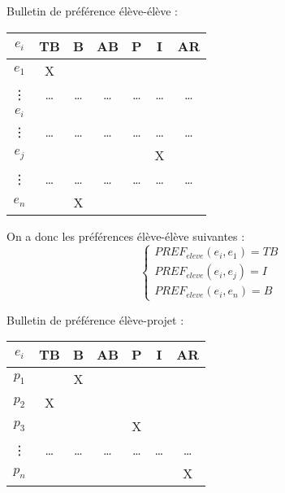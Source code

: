 \documentclass[10pt,a4paper]{scrartcl}
\begin{document}
\begin{table}[h!]
	\begin{minipage}{.4\linewidth}
		Bulletin de préférence élève-élève :\\
		\begin{tabular}[h]{|*{7}{c|}}
			\hline
			$e_{i}$  & TB  & B  & AB  & P  & I  & AR \\
			\hline
			$e_{1}$  & X &  &  &  &  & \\
			\hline
			\vdots  & \ldots  & \ldots & \ldots & \ldots & \ldots & \ldots \\
			\hline
			$e_{i}$ & \cellcolor{gray}  & \cellcolor{gray} & \cellcolor{gray} & \cellcolor{gray} & \cellcolor{gray} & \cellcolor{gray} \\
			\hline
			\vdots  & \ldots  & \ldots & \ldots & \ldots & \ldots & \ldots \\
			\hline
			$e_{j}$  &  &  &  &  & X & \\
			\hline
			\vdots  & \ldots  & \ldots & \ldots & \ldots & \ldots & \ldots \\
			\hline
			$e_{n}$  &  & X &  &  &  & \\
			\hline
		\end{tabular}
		
		\vspace{0.2cm}
		On a donc les préférences élève-élève suivantes : \\
		$$ 
		\left\{
			\begin{array}{ll}
				PREF_{eleve}(e_{i}, e_{1}) = TB \\
				PREF_{eleve}(e_{i}, e_{j}) = I \\
				PREF_{eleve}(e_{i}, e_{n}) = B
			\end{array}
		\right.
		$$
	\end{minipage}
	\hfill
	\begin{minipage}[h]{.4\linewidth}
		Bulletin de préférence élève-projet :\\
		\begin{tabular}{|*{7}{c|}}
			\hline
			$e_{i}$  & TB  & B  & AB  & P  & I  & AR \\
			\hline
			$p_{1}$  &  & X &  &  &  & \\
			\hline
			$p_{2}$  & X &  &  &  &  & \\
			\hline
			$p_{3}$  &  &  &  & X &  & \\
			\hline
			\vdots  & \ldots  & \ldots & \ldots & \ldots & \ldots & \ldots \\
			\hline
			$p_{n}$  &  &  &  &  &  & X \\
			\hline
		\end{tabular}
	

\end{minipage}
\end{table}
\end{document}
